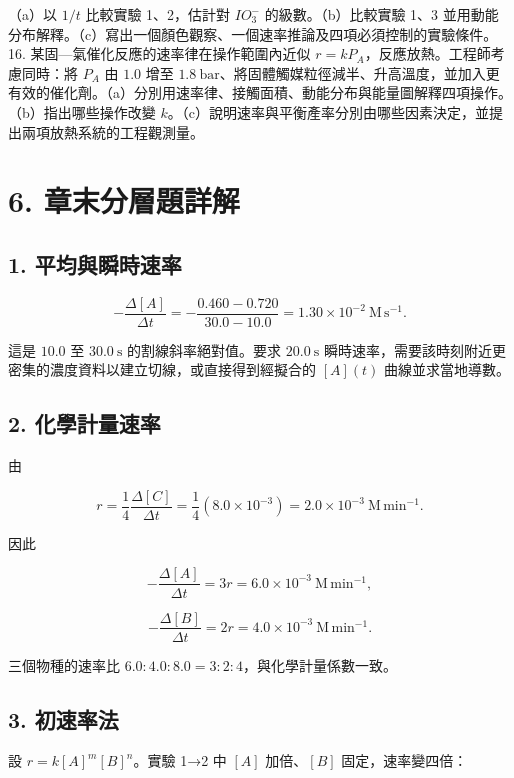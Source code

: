 \documentclass[11pt,a4paper]{article}
\begin{document}
（a）以 \(1/t\) 比較實驗 1、2，估計對 \(IO_3^-\) 的級數。（b）比較實驗 1、3 並用動能分布解釋。（c）寫出一個顏色觀察、一個速率推論及四項必須控制的實驗條件。
16. 某固---氣催化反應的速率律在操作範圍內近似 \(r=kP_A\)，反應放熱。工程師考慮同時：將 \(P_A\) 由 \(1.0\) 增至 \(1.8\ \mathrm{bar}\)、將固體觸媒粒徑減半、升高溫度，並加入更有效的催化劑。（a）分別用速率律、接觸面積、動能分布與能量圖解釋四項操作。（b）指出哪些操作改變 \(k\)。（c）說明速率與平衡產率分別由哪些因素決定，並提出兩項放熱系統的工程觀測量。

\section{6. 章末分層題詳解}\label{ux7ae0ux672bux5206ux5c64ux984cux8a73ux89e3}

\subsection{1. 平均與瞬時速率}\label{ux5e73ux5747ux8207ux77acux6642ux901fux7387}

\[
-\frac{\Delta[A]}{\Delta t}
=-\frac{0.460-0.720}{30.0-10.0}
=1.30\times10^{-2}\ \mathrm{M\,s^{-1}}.
\]

這是 \(10.0\) 至 \(30.0\ \mathrm s\) 的割線斜率絕對值。要求 \(20.0\ \mathrm s\) 瞬時速率，需要該時刻附近更密集的濃度資料以建立切線，或直接得到經擬合的 \([A](t)\) 曲線並求當地導數。

\subsection{2. 化學計量速率}\label{ux5316ux5b78ux8a08ux91cfux901fux7387}

由

\[
r=\frac14\frac{\Delta[C]}{\Delta t}
=\frac14(8.0\times10^{-3})
=2.0\times10^{-3}\ \mathrm{M\,min^{-1}}.
\]

因此

\[
-\frac{\Delta[A]}{\Delta t}=3r
=6.0\times10^{-3}\ \mathrm{M\,min^{-1}},
\]

\[
-\frac{\Delta[B]}{\Delta t}=2r
=4.0\times10^{-3}\ \mathrm{M\,min^{-1}}.
\]

三個物種的速率比 \(6.0:4.0:8.0=3:2:4\)，與化學計量係數一致。

\subsection{3. 初速率法}\label{ux521dux901fux7387ux6cd5}

設 \(r=k[A]^m[B]^n\)。實驗 1→2 中 \([A]\) 加倍、\([B]\) 固定，速率變四倍：
\end{document}

